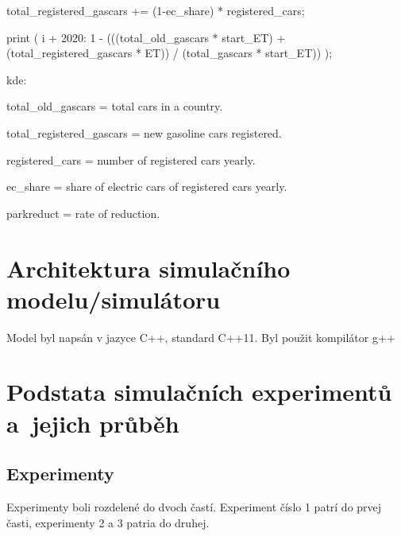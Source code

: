 \documentclass[a4paper, 11pt]{article}
\begin{document}
        total\_registered\_gascars += (1-ec\_share) * registered\_cars;
        
        \vspace*{1mm}
    
        \quad print ( i + 2020: 1 - (((total\_old\_gascars * start\_ET) + (total\_registered\_gascars * ET)) / (total\_gascars * start\_ET)) );
        
        \vspace*{1mm}
        
        
        
    kde:
    \vspace*{3mm}
    
     total\_old\_gascars = total cars in a country.
     
     \vspace*{2mm}
     
     total\_registered\_gascars = new gasoline cars registered.
     
     \vspace*{2mm}
     
     registered\_cars = number of registered cars yearly. 
     
     \vspace*{2mm}
     
     ec\_share = share of electric cars of registered cars yearly.
     
     \vspace*{2mm}
     
     parkreduct = rate of reduction.

	\section{Architektura simulačního modelu/simulátoru}
	
	Model byl napsán v jazyce C++, standard C++11. Byl použit kompilátor g++

	\section{Podstata simulačních experimentů a~jejich průběh}
	
	\subsection{Experimenty}
	Experimenty boli rozdelené do dvoch častí. Experiment číslo 1 patrí do prvej časti, experimenty 2 a 3 patria do druhej. %
	
\end{document}

